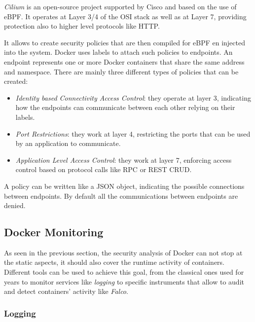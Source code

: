 \documentclass[a4paper,12pt]{article}
\begin{document}
\textit{Cilium} \cite{cilium_github} is an open-source project supported by Cisco and based on the
use of eBPF. It operates at Layer 3/4 of the OSI stack as well as at Layer 7,
providing protection also to higher level protocols like HTTP. \par It allows to
create security policies that are then compiled for eBPF en injected into the
system. Docker uses labels to attach such policies to endpoints. An endpoint
represents one or more Docker containers that share the same address and
namespace. There are mainly three different types of policies that can be
created:
\begin{itemize}
  \item \textit{Identity based Connectivity Access Control}: they operate at
  layer 3, indicating how the endpoints can communicate between each other
  relying on their labels. 
  \item \textit{Port Restrictions}: they work at layer 4, restricting the ports
  that can be used by an application to communicate.
  \item \textit{Application Level Access Control}: they work at layer 7,
  enforcing access control based on protocol calls like RPC or REST CRUD. 
\end{itemize} 
A policy can be written like a JSON object, indicating the possible connections
between endpoints. By default all the communications between endpoints are
denied.

\subsection{Docker Monitoring}

As seen in the previous section, the security analysis of Docker can not stop at
the static aspects, it should also cover the runtime activity of containers.
Different tools can be used to achieve this goal, from the classical ones used
for years to monitor services like \textit{logging} to specific instruments that
allow to audit and detect containers' activity like \textit{Falco}.

\subsubsection{Logging}
\end{document}
